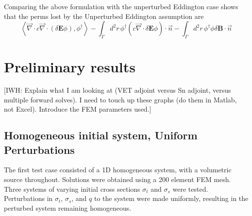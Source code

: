 \documentclass{article}
\newcommand{\bra}{\left\langle}
\newcommand{\ket}{\right\rangle}
\newcommand{\vdiv}{\vec{\nabla} \cdot}
\newcommand{\Edd}{\mathbf{E}}
\newcommand{\BEdd}{\mathbf{B}}
\newcommand{\sigt}{\sigma_t}
\newcommand{\sigs}{\sigma_s}
\newcommand{\isigt}{c}
\newcommand{\scalSource}{q}
\begin{document}
Comparing the above formulation with the unperturbed Eddington case shows that the perms lost by the Unperturbed Eddington assumption are 
\begin{equation}
\label{EddErr}
 \bra \vdiv \isigt \vdiv \left( \delta \Edd \phi \right), \phi^\dag \ket
- \int_\Gamma d^2 r \,  \phi^\dag \left( \isigt \vdiv \delta \Edd \phi \right) \cdot \vec{n}
- \int_\Gamma d^2 r \,  \phi^\dag \phi \delta \BEdd \cdot \vec{n}
\end{equation} 

\section{Preliminary results}
{\color{red}[IWH: Explain what I am looking at (VET adjoint versus Sn adjoint, versus multiple forward solves). I need to touch up these graphs (do them in Matlab, not Excel). Introduce the FEM parameters used.]}

\subsection{Homogeneous initial system, Uniform Perturbations}
The first test case consisted of a 1D homogeneous system, with a volumetric source throughout. Solutions were obtained using a 200 element FEM mesh. Three systems of varying initial cross sections $\sigt$ and $\sigs$ were tested. Perturbations in $\sigt$, $\sigs$, and $\scalSource$ to the system were made uniformly, resulting in the perturbed system remaining homogeneous.
\end{document}

